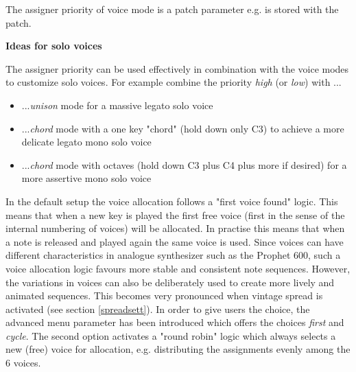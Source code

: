 The assigner priority of voice mode is a patch parameter e.g. is stored with the patch.

\textbf{Ideas for solo voices}

The assigner priority can be used effectively in combination with the voice modes to customize solo voices. For example combine the priority \textit{high} (or \textit{low}) with ...
\begin{itemize}
  \item ...\textit{unison} mode for a massive legato solo voice
  \item ...\textit{chord} mode with a one key "chord" (hold down only C3) to achieve a more delicate legato mono solo voice
  \item ...\textit{chord} mode with octaves (hold down C3 plus C4 plus more if desired) for a more assertive mono solo voice   
\end{itemize}

In the default setup the voice allocation follows a "first voice found" logic. This means that when a new key is played the first free voice (first in the sense of the internal numbering of voices) will be allocated. In practise this means that when a note is released and played again the same voice is used. Since voices can have different characteristics in analogue synthesizer such as the Prophet 600, such a voice allocation logic favours more stable and consistent note sequences. However, the variations in voices can also be deliberately used to create more lively and animated sequences. This becomes very pronounced when vintage spread is activated (see section \ref{spreadsett}). In order to give users the choice, the advanced menu parameter \assign has been introduced which offers the choices \textit{first} and \textit{cycle}. The second option activates a "round robin" logic which always selects a new (free) voice for allocation, e.g. distributing the assignments evenly among the 6 voices.   
